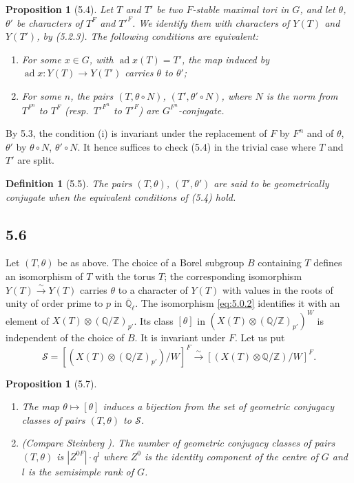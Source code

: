 \documentclass[11pt]{amsart}
\theoremstyle{plain}
\newtheorem{proposition}[theorem]{Proposition}
\newtheorem{definition}[theorem]{Definition}
\theoremstyle{remark}
\DeclareMathOperator{\ad}{ad}
\begin{document}
\begin{proposition}[5.4]
Let $T$ and $T'$ be two $F$-stable maximal tori in $G$, and let $\theta$, $\theta'$ be characters of $T^F$ and $T'^F$. We identify them with characters of $Y(T)$ and $Y(T')$, by (5.2.3). The following conditions are equivalent:
\begin{enumerate}
\item[(i)] For some $x \in G$, with $\ad x(T) = T'$, the map induced by $\ad x: Y(T) \to Y(T')$ carries $\theta$ to $\theta'$;
\item[(ii)] For some $n$, the pairs $(T, \theta \circ N)$, $(T', \theta' \circ N)$, where $N$ is the norm from $T^{F^n}$ to $T^F$ (resp.\ $T'^{F^n}$ to $T'^F$) are $G^{F^n}$-conjugate.
\end{enumerate}
\end{proposition}

By 5.3, the condition (i) is invariant under the replacement of $F$ by $F^n$ and of $\theta$, $\theta'$ by $\theta \circ N$, $\theta' \circ N$. It hence suffices to check (5.4) in the trivial case where $T$ and $T'$ are split.

\begin{definition}[5.5]
The pairs $(T, \theta)$, $(T', \theta')$ are said to be \textit{geometrically conjugate} when the equivalent conditions of (5.4) hold.
\end{definition}

\subsection{5.6} Let $(T, \theta)$ be as above. The choice of a Borel subgroup $B$ containing $T$ defines an isomorphism of $T$ with the torus $T$; the corresponding isomorphism $Y(T) \xrightarrow{\sim} Y(T)$ carries $\theta$ to a character of $Y(T)$ with values in the roots of unity of order prime to $p$ in $\overline{\mathbb{Q}}_\ell$. The isomorphism \eqref{eq:5.0.2} identifies it with an element of $X(T) \otimes (\mathbb{Q}/\mathbb{Z})_{p'}$. Its class $[\theta]$ in $(X(T) \otimes (\mathbb{Q}/\mathbb{Z})_{p'})^W$ is independent of the choice of $B$. It is invariant under $F$. Let us put
\[
\mathcal{S} = [(X(T) \otimes (\mathbb{Q}/\mathbb{Z})_{p'})/W]^F \xrightarrow{\sim} [(X(T) \otimes \mathbb{Q}/\mathbb{Z})/W]^F.
\]

\begin{proposition}[5.7]
\begin{enumerate}
\item[(i)] The map $\theta \mapsto [\theta]$ induces a bijection from the set of geometric conjugacy classes of pairs $(T, \theta)$ to $\mathcal{S}$.
\item[(ii)] (Compare Steinberg \cite[ p.\ 93]{Stein}). The number of geometric conjugacy classes of pairs $(T, \theta)$ is $|Z^{0F}| \cdot q^l$ where $Z^0$ is the identity component of the centre of $G$ and $l$ is the semisimple rank of $G$.
\end{enumerate}
\end{proposition}
\end{document}
